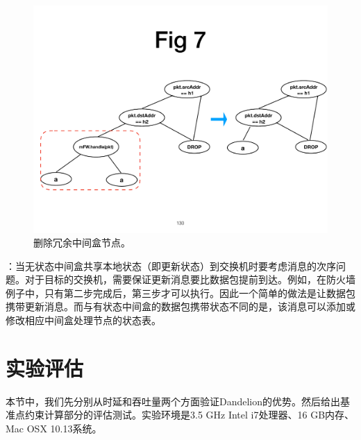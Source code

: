 \documentclass{ctexart}
\newcommand{\para}[1]{\noindent {\bf #1}}%
\begin{document}
\begin{figure}[!htbp]
\centering
      \centering\includegraphics[width=\linewidth]{figures/ss-130.pdf}
\caption{删除冗余中间盒节点。}
\label{fig:rv}
\end{figure}

\para{消息次序}：当无状态中间盒共享本地状态（即更新状态）到交换机时要考虑消息的次序问题。对于目标的交换机，需要保证更新消息要比数据包提前到达。例如，在防火墙例子中，只有第二步完成后，第三步才可以执行。因此一个简单的做法是让数据包携带更新消息。而与有状态中间盒的数据包携带状态不同的是，该消息可以添加或修改相应中间盒处理节点的状态表。


\section{实验评估}

本节中，我们先分别从时延和吞吐量两个方面验证Dandelion的优势。然后给出基准点约束计算部分的评估测试。实验环境是3.5 GHz Intel i7处理器、16 GB内存、Mac OSX 10.13系统。
\end{document}

